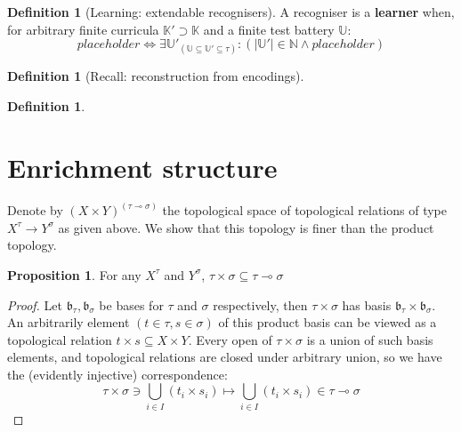 \documentclass{tufte-handout}
\theoremstyle{definition}
\newtheorem{proposition}[theorem]{Proposition}
\newtheorem{defn}[theorem]{Definition}
\newtheorem{remark}[theorem]{Remark}
\begin{document}

\begin{defn}[Learning: extendable recognisers]
A recogniser is a \textbf{learner} when, for arbitrary finite curricula $\mathbb{K}' \supset \mathbb{K}$ and a finite test battery $\mathbb{U}$:
\[placeholder \iff \exists \mathbb{U}'_{(\mathbb{U} \subseteq \mathbb{U}' \subseteq \tau)}:( |\mathbb{U}'| \in \mathbb{N} \wedge placeholder)\]

\end{defn}

\begin{defn}[Recall: reconstruction from encodings]

\end{defn}

\marginnote{
    \begin{remark}

    \end{remark}
}

\begin{defn}

\end{defn}



\section{Enrichment structure}



Denote by $(X \times Y)^{(\tau \multimap \sigma)}$ the topological space of topological relations of type $X^\tau \rightarrow Y^\sigma$ as given above. We show that this topology is finer than the product topology.

\begin{proposition}
For any $X^\tau$ and $Y^\sigma$, $\tau \times \sigma \subseteq \tau \multimap \sigma$
\begin{proof}
Let $\mathfrak{b}_\tau, \mathfrak{b}_\sigma$ be bases for $\tau$ and $\sigma$ respectively, then $\tau \times \sigma$ has basis $\mathfrak{b}_\tau \times \mathfrak{b}_\sigma$. An arbitrarily element $(t \in \tau, s \in \sigma)$ of this product basis can be viewed as a topological relation $t \times s \subseteq X \times Y$. Every open of $\tau \times \sigma$ is a union of such basis elements, and topological relations are closed under arbitrary union, so we have the (evidently injective) correspondence:
\[ \tau \times \sigma \ni \bigcup\limits_{i \in I}(t_i \times s_i) \mapsto \bigcup\limits_{i \in I}(t_i \times s_i) \in \tau \multimap \sigma \]
\end{proof}
\end{proposition}
\end{document}
